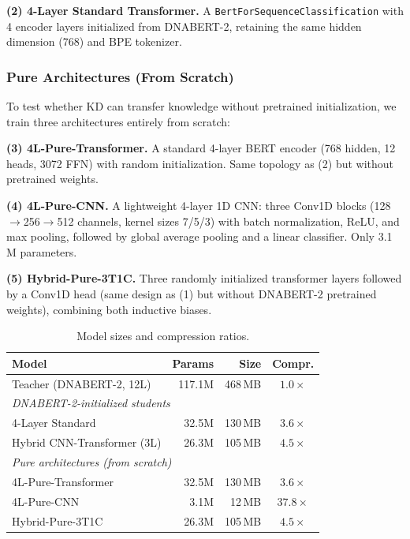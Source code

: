 \documentclass[conference]{IEEEtran}
\begin{document}
\textbf{(2) 4-Layer Standard Transformer.}\quad
A \texttt{BertForSequenceClassification} with 4 encoder layers initialized from DNABERT-2, retaining the same hidden dimension (768) and BPE tokenizer.

\subsubsection{Pure Architectures (From Scratch)}

To test whether KD can transfer knowledge without pretrained initialization, we train three architectures entirely from scratch:

\textbf{(3) 4L-Pure-Transformer.}\quad
A standard 4-layer BERT encoder (768 hidden, 12 heads, 3072 FFN) with random initialization. Same topology as (2) but without pretrained weights.

\textbf{(4) 4L-Pure-CNN.}\quad
A lightweight 4-layer 1D CNN: three Conv1D blocks (128$\to$256$\to$512 channels, kernel sizes 7/5/3) with batch normalization, ReLU, and max pooling, followed by global average pooling and a linear classifier. Only 3.1\,M parameters.

\textbf{(5) Hybrid-Pure-3T1C.}\quad
Three randomly initialized transformer layers followed by a Conv1D head (same design as (1) but without DNABERT-2 pretrained weights), combining both inductive biases.

\begin{table}[t]
\centering
\caption{Model sizes and compression ratios.}
\label{tab:sizes}
\begin{tabular}{lrrc}
\toprule
\textbf{Model} & \textbf{Params} & \textbf{Size} & \textbf{Compr.} \\
\midrule
Teacher (DNABERT-2, 12L) & 117.1M & 468\,MB & $1.0\times$ \\
\midrule
\multicolumn{4}{l}{\emph{DNABERT-2-initialized students}} \\
4-Layer Standard & 32.5M & 130\,MB & $3.6\times$ \\
Hybrid CNN-Transformer (3L) & 26.3M & 105\,MB & $4.5\times$ \\
\midrule
\multicolumn{4}{l}{\emph{Pure architectures (from scratch)}} \\
4L-Pure-Transformer & 32.5M & 130\,MB & $3.6\times$ \\
4L-Pure-CNN & 3.1M & 12\,MB & $37.8\times$ \\
Hybrid-Pure-3T1C & 26.3M & 105\,MB & $4.5\times$ \\
\bottomrule
\end{tabular}
\end{table}
\end{document}
